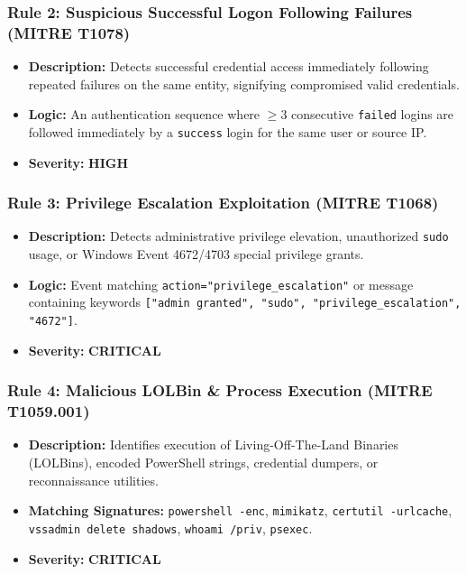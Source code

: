 \documentclass[11pt,a4paper]{article}
\begin{document}
\subsubsection{Rule 2: Suspicious Successful Logon Following Failures (MITRE T1078)}
\begin{itemize}
    \item \textbf{Description:} Detects successful credential access immediately following repeated failures on the same entity, signifying compromised valid credentials.
    \item \textbf{Logic:} An authentication sequence where $\ge 3$ consecutive \texttt{failed} logins are followed immediately by a \texttt{success} login for the same user or source IP.
    \item \textbf{Severity:} \textcolor{alertorange}{\textbf{HIGH}}
\end{itemize}

\subsubsection{Rule 3: Privilege Escalation Exploitation (MITRE T1068)}
\begin{itemize}
    \item \textbf{Description:} Detects administrative privilege elevation, unauthorized \texttt{sudo} usage, or Windows Event 4672/4703 special privilege grants.
    \item \textbf{Logic:} Event matching \texttt{action="privilege\_escalation"} or message containing keywords \texttt{["admin granted", "sudo", "privilege_escalation", "4672"]}.
    \item \textbf{Severity:} \textcolor{criticalred}{\textbf{CRITICAL}}
\end{itemize}

\subsubsection{Rule 4: Malicious LOLBin \& Process Execution (MITRE T1059.001)}
\begin{itemize}
    \item \textbf{Description:} Identifies execution of Living-Off-The-Land Binaries (LOLBins), encoded PowerShell strings, credential dumpers, or reconnaissance utilities.
    \item \textbf{Matching Signatures:} \texttt{powershell -enc}, \texttt{mimikatz}, \texttt{certutil -urlcache}, \texttt{vssadmin delete shadows}, \texttt{whoami /priv}, \texttt{psexec}.
    \item \textbf{Severity:} \textcolor{criticalred}{\textbf{CRITICAL}}
\end{itemize}
\end{document}
